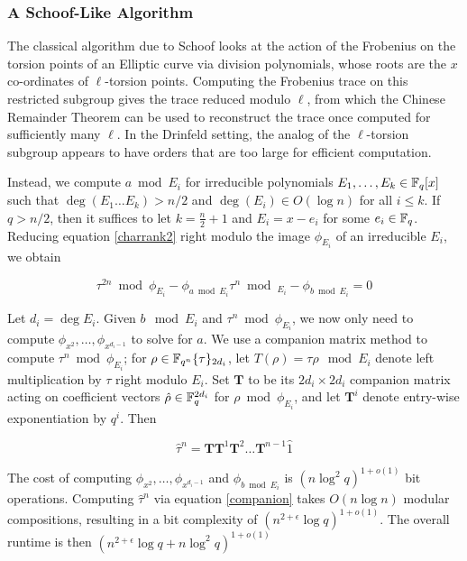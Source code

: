 \subsubsection{A Schoof-Like Algorithm}

The classical algorithm due to Schoof \cite{schoof85} looks at the action of the Frobenius on the torsion points of an Elliptic curve via division polynomials, whose roots are the $x$ co-ordinates of $\ell$-torsion points. Computing the Frobenius trace on this restricted subgroup gives the trace reduced modulo $\ell$, from which the Chinese Remainder Theorem can be used to reconstruct the trace once computed for sufficiently many $\ell$. In the Drinfeld setting, the analog of the $\ell$-torsion subgroup appears to have orders that are too large for efficient computation.

Instead, we compute $a \bmod E_i$ for irreducible polynomials $E_1, \ldots, E_k \in \mathbb{F}_q[x]$ such that $\deg(E_1 \ldots E_k) > n/2$ and $\deg(E_i) \in O(\log n)$ for all $i \leq k$. If $q > n/2$, then it suffices to let $k = \frac{n}{2} + 1$ and $E_i = x - e_i$ for some $e_i \in \mathbb{F}_q$. Reducing equation \ref{charrank2} right modulo the image $\phi_{E_i}$ of an irreducible $E_i$, we obtain

\begin{equation}\label{modchar}
    \tau^{2n} \bmod \phi_{E_i} - \phi_{a \bmod E_i}\tau^n \bmod_{E_i} - \phi_{b \bmod E_i} = 0
\end{equation}

Let $d_i = \deg E_i$. Given $b \mod E_i$ and $\tau^n \bmod \phi_{E_i}$, we now only need to compute $\phi_{x^2}, \ldots, \phi_{x^{d_i -1}}$ to solve for $a$.  We use a companion matrix method to compute $\tau^n \bmod \phi_{E_i}$; for $\rho \in \mathbb{F}_{q^n}\{\tau\}_{2d_i}$, let $T(\rho) = \tau \rho \mod E_i$ denote left multiplication by $\tau$ right modulo $E_i$. Set $\mathbf{T}$ to be its $2d_i \times 2d_i$ companion matrix acting on coefficient vectors $\hat{\rho} \in \mathbb{F}_q^{2d_i} $ for $\rho \bmod \phi_{E_i}$, and let $\mathbf{T}^{i}$ denote entry-wise exponentiation by $q^i$. Then 

\begin{equation}\label{companion}
    \hat{\tau}^n = \mathbf{T}\mathbf{T}^{1} \mathbf{T}^{2} \ldots \mathbf{T}^{n-1}\hat{1}
\end{equation}

The cost of computing $\phi_{x^2}, \ldots, \phi_{x^{d_i -1}}$ and $\phi_{b \bmod E_i}$ is $(n\log^2q)^{1+o(1)}$ bit operations. Computing $\hat{\tau}^n$ via equation \ref{companion} takes $O(n\log n)$ modular compositions, resulting in a bit complexity of $(n^{2+\epsilon}\log q)^{1+o(1)}$. The overall runtime is then $(n^{2+\epsilon}\log q + n \log^2q)^{1+o(1)}$ 


